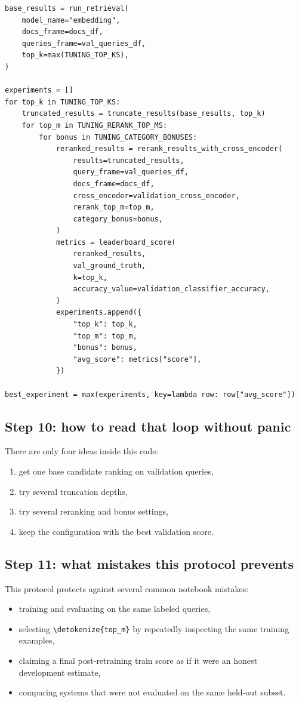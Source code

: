 \documentclass[10pt]{article}
\DeclareRobustCommand{\code}[1]{%
  \ifmmode
    \text{\nolinkurl{\detokenize{#1}}}%
  \else
    \nolinkurl{\detokenize{#1}}%
  \fi
}
\begin{document}
\begin{lstlisting}[caption={Study version of a leakage-safe tuning loop}]
base_results = run_retrieval(
    model_name="embedding",
    docs_frame=docs_df,
    queries_frame=val_queries_df,
    top_k=max(TUNING_TOP_KS),
)

experiments = []
for top_k in TUNING_TOP_KS:
    truncated_results = truncate_results(base_results, top_k)
    for top_m in TUNING_RERANK_TOP_MS:
        for bonus in TUNING_CATEGORY_BONUSES:
            reranked_results = rerank_results_with_cross_encoder(
                results=truncated_results,
                query_frame=val_queries_df,
                docs_frame=docs_df,
                cross_encoder=validation_cross_encoder,
                rerank_top_m=top_m,
                category_bonus=bonus,
            )
            metrics = leaderboard_score(
                reranked_results,
                val_ground_truth,
                k=top_k,
                accuracy_value=validation_classifier_accuracy,
            )
            experiments.append({
                "top_k": top_k,
                "top_m": top_m,
                "bonus": bonus,
                "avg_score": metrics["score"],
            })

best_experiment = max(experiments, key=lambda row: row["avg_score"])
\end{lstlisting}

\subsection*{Step 10: how to read that loop without panic}

There are only four ideas inside this code:
\begin{enumerate}
    \item get one base candidate ranking on validation queries,
    \item try several truncation depths,
    \item try several reranking and bonus settings,
    \item keep the configuration with the best validation score.
\end{enumerate}

\subsection*{Step 11: what mistakes this protocol prevents}

This protocol protects against several common notebook mistakes:
\begin{itemize}
    \item training and evaluating on the same labeled queries,
    \item selecting \code{top_m} by repeatedly inspecting the same training examples,
    \item claiming a final post-retraining train score as if it were an honest development estimate,
    \item comparing systems that were not evaluated on the same held-out subset.
\end{itemize}
\end{document}
